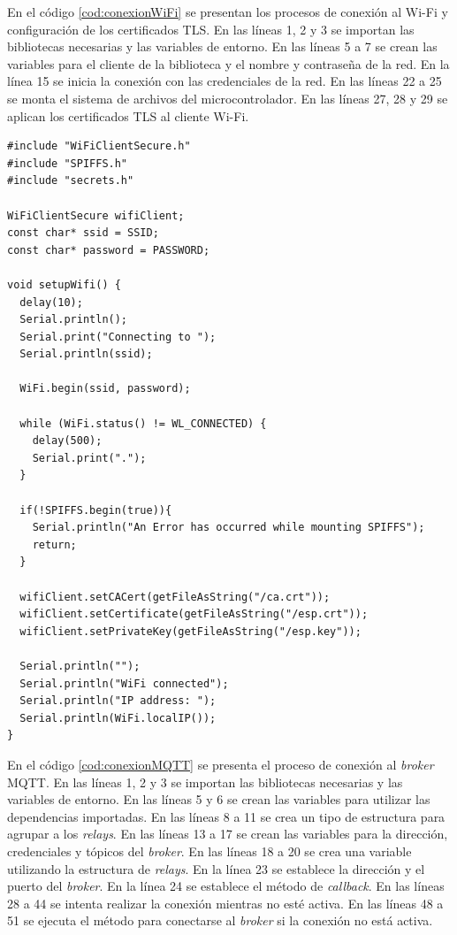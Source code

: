 
En el código \ref{cod:conexionWiFi} se presentan los procesos de conexión al Wi-Fi y configuración de los certificados TLS. En las líneas 1, 2 y 3 se importan las bibliotecas necesarias y las variables de entorno. En las líneas 5 a 7 se crean las variables para el cliente de la biblioteca y el nombre y contraseña de la red. En la línea 15 se inicia la conexión con las credenciales de la red. En las líneas 22 a 25 se monta el sistema de archivos del microcontrolador. En las líneas 27, 28 y 29 se aplican los certificados TLS al cliente Wi-Fi.

\begin{lstlisting}[label=cod:conexionWiFi,caption=Conexión Wi-Fi y configuración de los certificados TLS]
#include "WiFiClientSecure.h"
#include "SPIFFS.h"
#include "secrets.h"

WiFiClientSecure wifiClient;
const char* ssid = SSID;
const char* password = PASSWORD;

void setupWifi() {
  delay(10);
  Serial.println();
  Serial.print("Connecting to ");
  Serial.println(ssid);

  WiFi.begin(ssid, password);

  while (WiFi.status() != WL_CONNECTED) {
    delay(500);
    Serial.print(".");
  }

  if(!SPIFFS.begin(true)){
    Serial.println("An Error has occurred while mounting SPIFFS");
    return;
  }
  
  wifiClient.setCACert(getFileAsString("/ca.crt"));
  wifiClient.setCertificate(getFileAsString("/esp.crt"));
  wifiClient.setPrivateKey(getFileAsString("/esp.key"));
  
  Serial.println("");
  Serial.println("WiFi connected");
  Serial.println("IP address: ");
  Serial.println(WiFi.localIP());
}
\end{lstlisting}

En el código \ref{cod:conexionMQTT} se presenta el proceso de conexión al \emph{broker} MQTT. En las líneas 1, 2 y 3 se importan las bibliotecas necesarias y las variables de entorno.  En las  líneas 5 y 6 se crean las variables para utilizar las dependencias importadas. En las líneas 8 a 11 se crea un tipo de estructura para agrupar a los \textit{relays}. En las líneas 13 a 17 se crean las variables para la dirección, credenciales y tópicos del \emph{broker}. En las líneas 18 a 20 se crea una variable utilizando la estructura de \textit{relays}. En la línea 23 se establece la dirección y el puerto del \emph{broker}. En la línea 24 se establece el método de \emph{callback}. En las líneas 28 a 44 se intenta realizar la conexión mientras no esté activa. En las líneas 48 a 51 se ejecuta el método para conectarse al \emph{broker} si la conexión no está activa.

